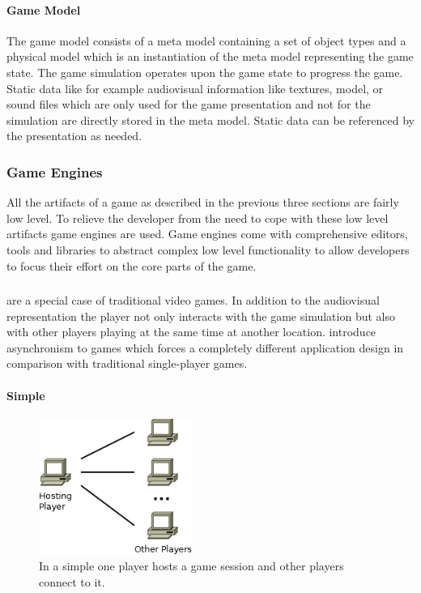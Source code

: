 \paragraph{Game Model}

The game model consists of a meta model containing a set of object types and a
physical model which is an instantiation of the meta model representing the game
state. The game simulation operates upon the game state to progress the game.
Static data like for example audiovisual information like textures, model, or
sound files which are only used for the game presentation and not for the
simulation are directly stored in the meta model. Static data can be referenced
by the presentation as needed.

\subsubsection{Game Engines}
All the artifacts of a game as described in the previous three sections are
fairly low level. To relieve the developer from the need to cope with these low
level artifacts game engines are used. Game engines come with comprehensive
editors, tools and libraries to abstract complex low level functionality to
allow developers to focus their effort on the core parts of the game.

\subsubsection{\ogs{}}
\ogs{} are a special case of traditional video games. In addition to the
audiovisual representation the player not only interacts with the game
simulation but also with other players playing at the same time at another
location. \ogs{} introduce asynchronism to games which forces a completely
different application design in comparison with traditional single-player games.

\paragraph{Simple \ogs{}}

\begin{figure}
	\centering
	\includegraphics[width=5cm]{images/SimpleOnlineGame}
	\caption{In a simple \og{} one player hosts a game session and other players
	connect to it.}
	\label{fig:simple_online_game}
\end{figure}


